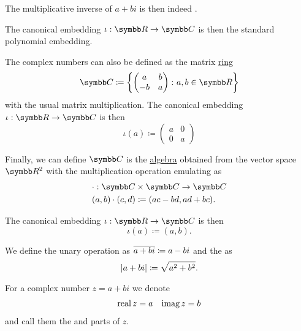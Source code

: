 \begin{Definition}
\begin{DefEnum}
    The multiplicative inverse of \( a + bi \) is then indeed .

    The canonical embedding \( \iota: \BR \to \BC \) is then the standard polynomial embedding.

     The complex numbers can also be defined as the matrix \hyperref[def:algebra_of_matrices]{ring}
    \begin{equation*}
      \BC \coloneqq \left\{
        \begin{pmatrix}
          a & b \\
          -b & a
        \end{pmatrix}
      \colon a, b \in \BR \right\}
    \end{equation*}
    with the usual matrix multiplication. The canonical embedding \( \iota: \BR \to \BC \) is then
    \begin{equation*}
      \iota(a) \coloneqq \begin{pmatrix}
        a & 0 \\
        0 & a
      \end{pmatrix}
    \end{equation*}

     Finally, we can define \( \BC \) is the \hyperref[def:algebra_over_ring]{algebra} obtained from the vector space \( \BR^2 \) with the multiplication operation emulating  as
    \begin{align*}
      &\cdot: \BC \times \BC \to \BC \\
      &(a, b) \cdot (c, d) \coloneqq (ac - bd, ad + bc).
    \end{align*}

    The canonical embedding \( \iota: \BR \to \BC \) is then
    \begin{equation*}
      \iota(a) \coloneqq (a, b).
    \end{equation*}
  \end{DefEnum}

  We define the unary  operation as \( \overline{a + bi} \coloneqq a - bi \) and the  as
  \begin{equation*}
    \left\vert a + bi \right\vert \coloneqq \sqrt{a^2 + b^2}.
  \end{equation*}

  For a complex number \( z = a + bi \) we denote
  \begin{align*}
    \operatorname{real} z = a && \operatorname{imag} z = b
  \end{align*}
  and call them the  and  parts of \( z \).
\end{Definition}

